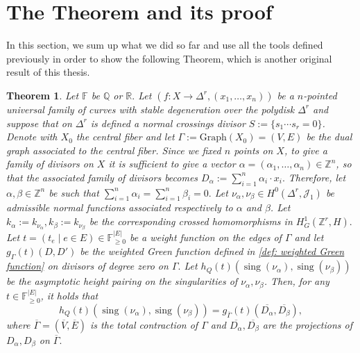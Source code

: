 \documentclass[a4paper,12 pt,titlepage,twoside]{book}
\newcommand{\numberset}{\mathbb}
\newcommand{\Z}{\numberset{Z}}
\newcommand{\R}{\numberset{R}}
\newcommand{\Q}{\numberset{Q}}
\newcommand{\F}{\numberset{F}}
\DeclareMathOperator{\sing}{sing}
\theoremstyle{plain}
\newtheorem{thm}{Theorem}[section]
\theoremstyle{theorem}
\theoremstyle{definition}
\theoremstyle{remark}
\begin{document}
	\section{The Theorem and its proof}
	In this section, we sum up what we did so far and use all the tools defined previously in order to show the following Theorem, which is another original result of this thesis.
	\begin{thm}\label{thm: equality green ahp}
		Let $\F$ be $\Q$ or $\R.$ Let $(f\colon X \rightarrow \Delta^r, (x_1, \dots, x_n))$ be a $n$-pointed universal family of curves with stable degeneration over the polydisk $\Delta^r$ and suppose that on $\Delta^r$ is defined a normal crossings divisor $S := \{s_1 \cdots s_r =0\}$. Denote with $X_0$ the central fiber and let $\Gamma := \text{Graph}(X_0) =(V,E)$ be the dual graph associated to the central fiber. Since we fixed $n$ points on $X$, to give a family of divisors on $X$ it is sufficient to give a vector $\alpha =(\alpha_1, \dots, \alpha_n)\in \Z^n$, so that the associated family of divisors becomes $D_\alpha := \sum_{i=1}^n \alpha_i \cdot x_i.$ Therefore, let $\alpha, \beta \in \Z^n$ be such that $\sum_{i=1}^n \alpha_i = \sum_{i=1}^n \beta_i = 0.$ Let $\nu_\alpha, \nu_\beta\in H^0(\Delta^r, \mathcal{J}_1)$ be admissible normal functions associated respectively to $\alpha$ and $\beta$. Let $k_\alpha := k_{\nu_\alpha}, k_\beta:=k_{\nu_\beta}$ be the corresponding crossed homomorphisms in $H^1_G(\Z^r, H).$
		Let $t = (t_e \mid e \in E) \in \F^{|E|}_{\ge 0}$ be a weight function on the edges of $\Gamma$ and let $g_\Gamma(t)(D,D')$ be the weighted Green function defined in \ref{def: weighted Green function} on divisors of degree zero on $\Gamma.$ Let $h_Q(t)(\sing(\nu_\alpha),\sing(\nu_\beta))$ be the asymptotic height pairing on the singularities of $\nu_\alpha, \nu_\beta$. Then, for any $t \in \F^{|E|}_{\ge 0}$, it holds that \begin{equation}\label{eq: ahp equal Green}
		h_Q(t)(\sing(\nu_\alpha), \sing(\nu_\beta)) = g_{\overline{\Gamma}}(t)(\overline{D_\alpha}, \overline{D_\beta}),
		\end{equation} where $\overline{\Gamma} = (\overline{V},\overline{E})$ is the total contraction of $\Gamma$ and $\overline{D_\alpha}, \overline{D_\beta}$ are the projections of $D_\alpha,D_\beta$ on $\overline{\Gamma}.$
	\end{thm}
\end{document}
